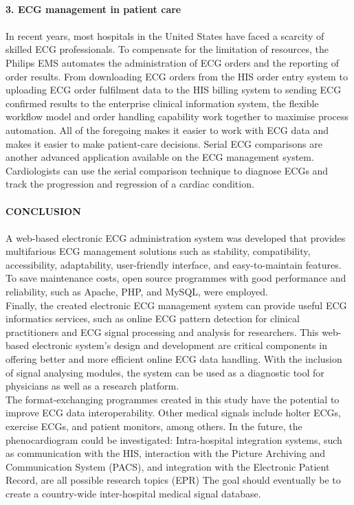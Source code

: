 \documentclass[12pt]{article}
\begin{document}
\paragraph{\textbf{3. ECG management in patient care}}
\paragraph{}In recent years, most hospitals in the United States have faced a scarcity of skilled ECG professionals. To compensate for the limitation of resources, the Philips EMS automates the administration of ECG orders and the reporting of order results. From downloading ECG orders from the HIS order entry system to uploading ECG order fulfilment data to the HIS billing system to sending ECG confirmed results to the enterprise clinical information system, the flexible workflow model and order handling capability work together to maximise process automation. All of the foregoing makes it easier to work with ECG data and makes it easier to make patient-care decisions. Serial ECG comparisons are another advanced application available on the ECG management system. Cardiologists can use the serial comparison technique to diagnose ECGs and track the progression and regression of a cardiac condition.
\paragraph{\textbf{CONCLUSION}}
\paragraph{} A web-based electronic ECG administration system was developed that provides multifarious ECG management solutions such as stability, compatibility, accessibility, adaptability, user-friendly interface, and easy-to-maintain features. To save maintenance costs, open source programmes with good performance and reliability, such as Apache, PHP, and MySQL, were employed.\\Finally, the created electronic ECG management system can provide useful ECG informatics services, such as online ECG pattern detection for clinical practitioners and ECG signal processing and analysis for researchers. This web-based electronic system's design and development are critical components in offering better and more efficient online ECG data handling. With the inclusion of signal analysing modules, the system can be used as a diagnostic tool for physicians as well as a research platform.\\The format-exchanging programmes created in this study have the potential to improve ECG data interoperability. Other medical signals include holter ECGs, exercise ECGs, and patient monitors, among others. In the future, the phenocardiogram could be investigated: Intra-hospital integration systems, such as communication with the HIS, interaction with the Picture Archiving and Communication System (PACS), and integration with the Electronic Patient Record, are all possible research topics (EPR) The goal should eventually be to create a country-wide inter-hospital medical signal database.
\end{document}
